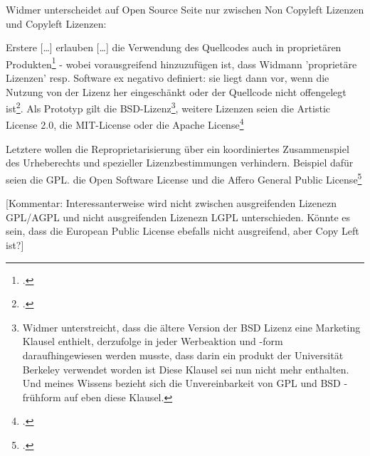\documentclass[DIV=calc,BCOR=5mm,11pt,headings=small,oneside,abstract=true, toc=bib]{scrartcl}
\begin{document}
 Widmer unterscheidet auf Open Source Seite nur zwischen Non Copyleft Lizenzen
 und Copyleft Lizenzen: 
 
 Erstere \glqq{}[\ldots] erlauben [\ldots] die Verwendung des Quellcodes auch in
 proprietären Produkten\grqq{}\footcite[vgl.][37]{Widmer2003a} - wobei
 vorausgreifend hinzuzufügen ist, dass Widmann 'proprietäre Lizenzen' resp.
 Software ex negativo definiert: sie liegt dann vor, wenn die Nutzung von der
 Lizenz her eingeschänkt oder der Quellcode nicht offengelegt
 ist\footcite[vgl.][39]{Widmer2003a}. Als Prototyp gilt die
 BSD-Lizenz\footnote{Widmer unterstreicht, dass die ältere Version der BSD
 Lizenz eine Marketing Klausel enthielt, derzufolge in jeder Werbeaktion und
 -form daraufhingewiesen werden musste, dass darin ein produkt der Universität
 Berkeley verwendet worden ist\cite[vgl.][37]{Widmer2003a} Diese Klausel sei
 nun nicht mehr enthalten. Und meines Wissens bezieht sich die Unvereinbarkeit
 von GPL und BSD - frühform auf eben diese Klausel.}, weitere Lizenzen seien die
 Artistic License 2.0, die MIT-License oder die Apache
 License\footcite[vgl.][38]{Widmer2003a}
 
 Letztere wollen die Reproprietarisierung über ein \glqq{}koordiniertes
 Zusammenspiel des Urheberechts und spezieller Lizenzbestimmungen\grqq{}
 verhindern. Beispiel dafür seien die GPL. die Open Software License und die
 Affero General Public License\footcite[vgl.][38]{Widmer2003a}
 
 [Kommentar: Interessanterweise wird nicht zwischen ausgreifenden Lizenezn
 GPL/AGPL und nicht ausgreifenden Lizenezn LGPL unterschieden. Könnte es sein,
 dass die European Public License ebefalls nicht ausgreifend, aber Copy Left
 ist?]
 
\end{document}
